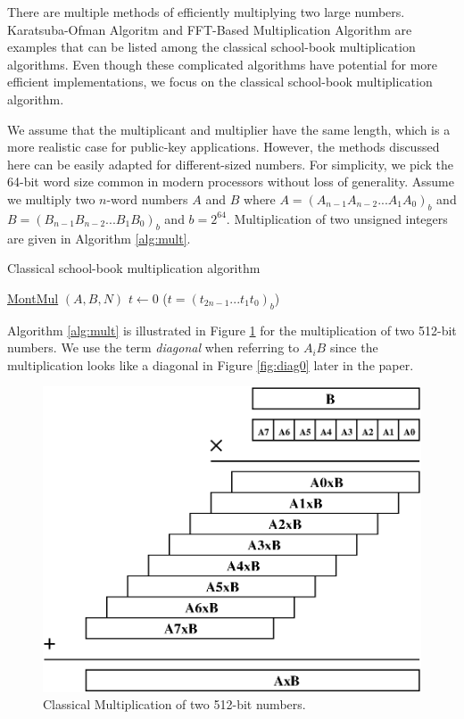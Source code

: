 \documentclass[twocolumn]{svjour3}          %
\begin{document}
There are multiple methods of efficiently multiplying two large numbers. Karatsuba-Ofman Algoritm \cite{karatsuba} and FFT-Based Multiplication Algorithm \cite{Schonhage1971} are examples that can be listed among the classical school-book multiplication algorithms. Even though these complicated algorithms have potential for more efficient implementations, we focus on the classical school-book multiplication algorithm. 

We assume that the multiplicant and multiplier have the same length, which is a more realistic case for public-key applications. However, the methods discussed here can be easily adapted for different-sized numbers. For simplicity, we pick the 64-bit word size common in modern processors without loss of generality. Assume we multiply two $n$-word numbers $A$ and $B$ where $A = (A_{n-1}A_{n-2}...A_1A_0)_b$ and $B = (B_{n-1}B_{n-2}...B_1B_0)_b$ and $b=2^{64}$. Multiplication of two unsigned integers are given in Algorithm \ref{alg:mult}. 

\begin{algorithm}
\label{alg:mult}
\caption{Classical school-book multiplication algorithm}
\underline{MontMul} $(A,B,N)$\;
$\textit{t} \gets 0$ ($t=(t_{2n-1}...t_1t_0)_b$)\\
\end{algorithm}

Algorithm \ref{alg:mult} is illustrated in Figure \ref{fig:mult} for the multiplication of two 512-bit numbers.
%
We use the term \textit{diagonal} when referring to $A_iB$ since the multiplication looks like a diagonal in Figure \ref{fig:diag0} later in the paper.

\begin{figure}
\centering
  \includegraphics[scale=0.7]{mul.eps}
\caption{Classical Multiplication of two 512-bit numbers.  }
\label{fig:mult}
\end{figure}
\end{document}
